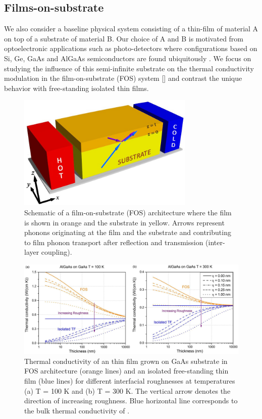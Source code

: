\subsection{Films-on-substrate}
We also consider a baseline physical system consisting of a thin-film of material A on top of a substrate of material B. Our choice of A and B is motivated from optoelectronic applications such as photo-detectors where configurations based on Si, Ge, GaAs and AlGaAs semiconductors are found ubiquitously \cite{book_rogalski_infrared,RN387,ownKK1}. We focus on studying the influence of this semi-infinite substrate on the thermal conductivity modulation in the film-on-substrate (FOS) system [] and contrast the unique behavior with free-standing isolated thin films.
\begin{figure}[hbt]
  \centering \includegraphics[width=0.75\textwidth]{figures/ch5/Fig5-fos1.jpg}
  \caption{Schematic of a film-on-substrate (FOS) architecture where the film is shown in orange and the substrate in yellow. Arrows represent phonons originating at the film and the substrate and contributing to film phonon transport after reflection and transmission (inter-layer coupling).}
    \label{fig:ch5-fos1}
 \end{figure}
\begin{figure}[hbt]
  \centering \includegraphics[width=1.0\textwidth]{figures/ch5/Fig5-fos2.jpg}
  \caption{Thermal conductivity of an  thin film grown on GaAs substrate in FOS architecture (orange lines) and an isolated free-standing  thin film (blue lines) for different interfacial roughnesses at temperatures (a) \gls{T} = 100 K and (b) \gls{T} = 300 K. The vertical arrow denotes the direction of increasing roughness. Blue horizontal line corresponds to the bulk thermal conductivity of .}
    \label{fig:ch5-fos2}
 \end{figure}
